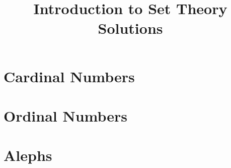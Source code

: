 



\title{Introduction to Set Theory Solutions}




\qformat{}

\newcommand{\itm}[1]{\refstepcounter{itm}\label{#1}\arabic{itm}}


\begin{questions}


\setcounter{section}{4}
\section{Cardinal Numbers}


\section{Ordinal Numbers}


\section{Alephs}


\end{questions}

